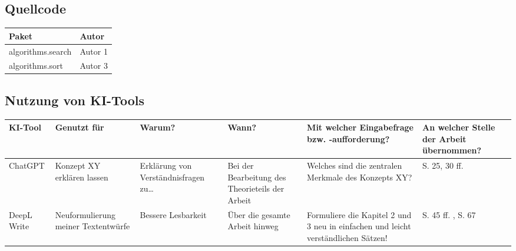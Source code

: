 \subsection*{Quellcode}

\begin{table}
	\begin{small}
	\begin{tabularx}{\textwidth}{|X|X|}
		\hline		
		\textbf{Paket} & \textbf{Autor}\\
		\hline
		algorithms.search & Autor 1\\
		\hline
		algorithms.sort & Autor 3\\
		\hline
	\end{tabularx}
	\end{small}
\end{table}

\newpage

\subsection*{Nutzung von KI-Tools}

\begin{table}
	\begin{small}	
	\begin{tabularx}{\textwidth}{|X|X|X|X|X|X|}
		\hline		
		\textbf{KI-Tool} & \textbf{Genutzt für} & \textbf{Warum?} & \textbf{Wann?} & \textbf{Mit welcher Eingabefrage bzw. -aufforderung?} & \textbf{An welcher Stelle der Arbeit übernommen?}\\
		\hline
		ChatGPT & Konzept XY erklären lassen & Erklärung von Verständnisfragen zu… & Bei der Bearbeitung des Theorieteils der Arbeit & Welches sind die zentralen Merkmale des Konzepts XY? & S. 25, 30 ff.\\
		\hline
		DeepL Write & Neuformulierung meiner Textentwürfe & Bessere Lesbarkeit & Über die gesamte Arbeit hinweg & Formuliere die Kapitel 2 und 3 neu in einfachen und leicht verständlichen Sätzen! & S. 45 ff. , S. 67\\
		\hline
	\end{tabularx}
	\end{small}
\end{table}

